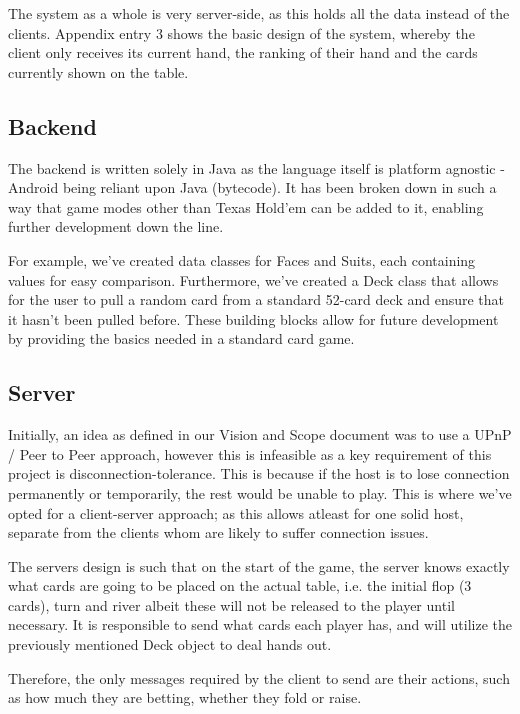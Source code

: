 \documentclass[11pt]{article}
\begin{document}
The system as a whole is very server-side, as this holds all the data instead of the clients. Appendix entry 3 shows the basic design of the system, whereby the client only receives its current hand, the ranking of their hand and the cards currently shown on the table. 




\subsection{Backend}

The backend is written solely in Java as the language itself is platform agnostic - Android being reliant upon Java (bytecode). It has been broken down in such a way that game modes other than Texas Hold'em can be added to it, enabling further development down the line. 

For example, we've created data classes for Faces and Suits, each containing values for easy comparison. Furthermore, we've created a Deck class that allows for the user to pull a random card from a standard 52-card deck and ensure that it hasn't been pulled before. These building blocks allow for future development by providing the basics needed in a standard card game.



\subsection{Server}

Initially, an idea as defined in our Vision and Scope document was to use a UPnP / Peer to Peer approach, however this is infeasible as a key requirement of this project is disconnection-tolerance. This is because if the host is to lose connection permanently or temporarily, the rest would be unable to play.
This is where we've opted for a client-server approach; as this allows atleast for one solid host, separate from the clients whom are likely to suffer connection issues. 

The servers design is such that on the start of the game, the server knows exactly what cards are going to be placed on the actual table, i.e. the initial flop (3 cards), turn and river albeit these will not be released to the player until necessary. It is responsible to send what cards each player has, and will utilize the previously mentioned Deck object to deal hands out. 

Therefore, the only messages required by the client to send are their actions, such as how much they are betting, whether they fold or raise. 
\end{document}
